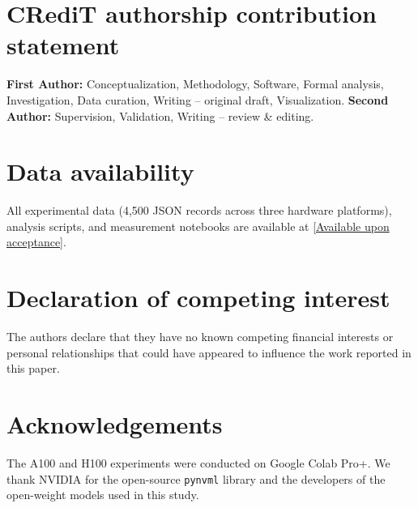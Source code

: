 \documentclass[preprint,12pt]{elsarticle}
\begin{document}

\section*{CRediT authorship contribution statement}

\textbf{First Author:} Conceptualization, Methodology, Software, Formal analysis, Investigation, Data curation, Writing -- original draft, Visualization. \textbf{Second Author:} Supervision, Validation, Writing -- review \& editing.


\section*{Data availability}

All experimental data (4,500 JSON records across three hardware platforms), analysis scripts, and measurement notebooks are available at \url{[Available upon acceptance]}.


\section*{Declaration of competing interest}

The authors declare that they have no known competing financial interests or personal relationships that could have appeared to influence the work reported in this paper.


\section*{Acknowledgements}

The A100 and H100 experiments were conducted on Google Colab Pro+. We thank NVIDIA for the open-source \texttt{pynvml} library and the developers of the open-weight models used in this study.




\end{document}
